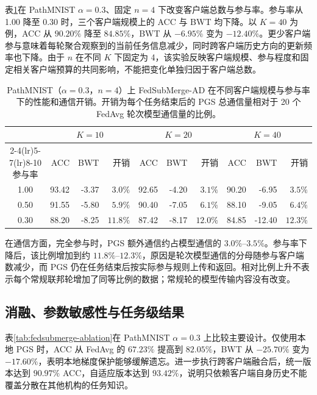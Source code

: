表\ref{tab:fedsubmerge-scalability}在 PathMNIST $\alpha=0.3$、固定 $n=4$ 下改变客户端总数与参与率。参与率从 1.00 降至 0.30 时，三个客户端规模上的 ACC 与 BWT 均下降。以 $K=40$ 为例，ACC 从 $90.20\%$ 降至 $84.85\%$，BWT 从 $-6.95\%$ 变为 $-12.40\%$。更少客户端参与意味着每轮聚合观察到的当前任务信息减少，同时跨客户端历史方向的更新频率也下降。由于 $n$ 在不同 $K$ 下固定为 4，该实验反映客户端规模、参与程度和固定相关客户端预算的共同影响，不能把变化单独归因于客户端总数。

\begin{table}[htbp]
\centering
\caption{PathMNIST（$\alpha=0.3$，$n=4$）上 FedSubMerge-AD 在不同客户端规模与参与率下的性能和通信开销。开销为每个任务结束后的 PGS 总通信量相对于 20 个 FedAvg 轮次模型通信量的比例。}
\label{tab:fedsubmerge-scalability}
\thesistablefont
\setlength{\tabcolsep}{3pt}
\renewcommand{\arraystretch}{1.12}
\begin{tabular}{crrrrrrrrr}
\toprule
& \multicolumn{3}{c}{$K=10$} & \multicolumn{3}{c}{$K=20$} & \multicolumn{3}{c}{$K=40$} \\
\cmidrule(lr){2-4}\cmidrule(lr){5-7}\cmidrule(lr){8-10}
参与率 & ACC & BWT & 开销 & ACC & BWT & 开销 & ACC & BWT & 开销 \\
\midrule
1.00 & 93.42 & -3.37 & $3.0\%$ & 92.65 & -4.20 & $3.1\%$ & 90.20 & -6.95 & $3.5\%$ \\
0.50 & 91.55 & -5.80 & $5.9\%$ & 90.40 & -7.05 & $6.1\%$ & 88.10 & -9.05 & $6.4\%$ \\
0.30 & 88.20 & -8.25 & $11.8\%$ & 87.42 & -8.17 & $12.0\%$ & 84.85 & -12.40 & $12.3\%$ \\
\bottomrule
\end{tabular}%

\end{table}

在通信方面，完全参与时，PGS 额外通信约占模型通信的 $3.0\%$--$3.5\%$。参与率下降后，该比例增加到约 $11.8\%$--$12.3\%$，原因是轮次模型通信的分母随参与客户端数减少，而 PGS 仍在任务结束后按实际参与规则上传和返回。相对比例上升不表示每个常规联邦轮增加了同等比例的数据；常规轮的模型传输内容没有改变。

\subsection{消融、参数敏感性与任务级结果}
\label{subsec:fedsubmerge-ablation}

表\ref{tab:fedsubmerge-ablation}在 PathMNIST $\alpha=0.3$ 上比较主要设计。仅使用本地 PGS 时，ACC 从 FedAvg 的 $67.23\%$ 提高到 $82.05\%$，BWT 从 $-25.70\%$ 变为 $-17.60\%$，表明本地梯度保护能够缓解遗忘。进一步执行跨客户端融合后，统一版本达到 $90.97\%$ ACC，自适应版本达到 $93.42\%$，说明只依赖客户端自身历史不能覆盖分散在其他机构的任务知识。

